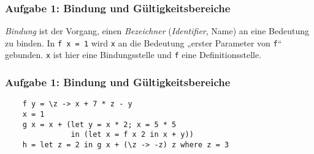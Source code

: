 \documentclass{beamer}
\date{2016-11-07/08}
\begin{document}
\normalsize
\normalem

\begin{frame}[plain]
  \titlepage
\end{frame}

\begin{frame}[fragile]
  \frametitle{Aufgabe 1: Bindung und Gültigkeitsbereiche}
  \emph{Bindung} ist der Vorgang, einen \emph{Bezeichner} (\emph{Identifier}, Name) an eine Bedeutung zu binden.
  In \lstinline{f x = 1} wird \lstinline{x} an die Bedeutung „erster Parameter von \lstinline{f}“ gebunden.
  \lstinline{x} ist hier eine Bindungsstelle und \lstinline{f} eine Definitionsstelle.
\end{frame}

\begin{frame}[fragile]
  \frametitle{Aufgabe 1: Bindung und Gültigkeitsbereiche}
  \begin{lstlisting}
    f y = \z -> x + 7 * z - y
    x = 1
    g x = x + (let y = x * 2; x = 5 * 5
               in (let x = f x 2 in x + y))
    h = let z = 2 in g x + (\z -> -z) z where z = 3
  \end{lstlisting}
\end{frame}
\end{document}
